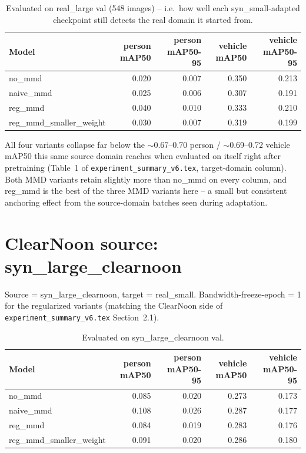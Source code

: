 \documentclass[11pt]{article}
\begin{document}
\begin{table}[h!]
    \centering
    \begin{tabular}{lrrrr}
        \toprule
        Model & person mAP50 & person mAP50-95 & vehicle mAP50 & vehicle mAP50-95 \\
        \midrule
        no\_mmd                  & 0.020 & 0.007 & 0.350 & 0.213 \\
        naive\_mmd               & 0.025 & 0.006 & 0.307 & 0.191 \\
        reg\_mmd                 & 0.040 & 0.010 & 0.333 & 0.210 \\
        reg\_mmd\_smaller\_weight & 0.030 & 0.007 & 0.319 & 0.199 \\
        \bottomrule
    \end{tabular}
    \caption{Evaluated on real\_large val (548 images) -- i.e.\ how well each
    syn\_small-adapted checkpoint still detects the real domain it started from.}
\end{table}

\noindent All four variants collapse far below the $\sim$0.67--0.70 person / $\sim$0.69--0.72
vehicle mAP50 this same source domain reaches when evaluated on itself right after
pretraining (Table~1 of \texttt{experiment\_summary\_v6.tex}, target-domain column).
Both MMD variants retain slightly more than no\_mmd on every column, and reg\_mmd is
the best of the three MMD variants here -- a small but consistent anchoring effect
from the source-domain batches seen during adaptation.

\section{ClearNoon source: syn\_large\_clearnoon}

Source = syn\_large\_clearnoon, target = real\_small. Bandwidth-freeze-epoch = 1 for
the regularized variants (matching the ClearNoon side of
\texttt{experiment\_summary\_v6.tex} Section~2.1).

\begin{table}[h!]
    \centering
    \begin{tabular}{lrrrr}
        \toprule
        Model & person mAP50 & person mAP50-95 & vehicle mAP50 & vehicle mAP50-95 \\
        \midrule
        no\_mmd                  & 0.085 & 0.020 & 0.273 & 0.173 \\
        naive\_mmd               & 0.108 & 0.026 & 0.287 & 0.177 \\
        reg\_mmd                 & 0.084 & 0.019 & 0.283 & 0.176 \\
        reg\_mmd\_smaller\_weight & 0.091 & 0.020 & 0.286 & 0.180 \\
        \bottomrule
    \end{tabular}
    \caption{Evaluated on syn\_large\_clearnoon val.}
\end{table}
\end{document}
